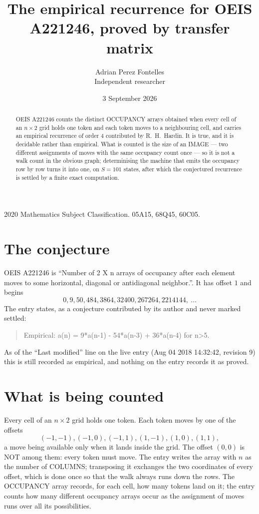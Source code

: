 \documentclass[11pt,a4paper]{article}
\title{The empirical recurrence for OEIS A221246, proved by transfer matrix}
\author{Adrian Perez Fontelles\\ \small Independent researcher}
\date{3 September 2026}
\theoremstyle{plain}
\theoremstyle{definition}
\begin{document}
\maketitle

\begin{abstract}
OEIS A221246 counts the distinct OCCUPANCY arrays obtained when every cell of an $n\times2$ grid
holds one token and each token moves to a neighbouring cell, and carries an empirical
recurrence of order $4$ contributed by R.~H.~Hardin. It is true, and it is decidable
rather than empirical. What is counted is the size of an IMAGE --- two different assignments of
moves with the same occupancy count once --- so it is not a walk count in the obvious graph;
determinising the machine that emits the occupancy row by row turns it into one, on $S=101$
states, after which the conjectured recurrence is settled by a finite exact computation.
\end{abstract}

\noindent\small 2020 Mathematics Subject Classification. 05A15, 68Q45, 60C05.\normalsize

\section{The conjecture}

OEIS A221246 is ``Number of 2 X n arrays of occupancy after each element moves to some horizontal, diagonal or antidiagonal neighbor.''. It has offset $1$ and begins
\[
0, 9, 50, 484, 3864, 32400, 267264, 2214144,\ \dots
\]
The entry states, as a conjecture contributed by its author and never marked settled:
\begin{quote}
Empirical: a(n) = 9*a(n-1) - 54*a(n-3) + 36*a(n-4) for n>5.
\end{quote}
As of the ``Last modified'' line on the live entry (Aug 04 2018 14:32:42, revision 9) this is still
recorded as empirical, and nothing on the entry records it as proved.

\section{What is being counted}

Every cell of an $n\times2$ grid holds one token. Each token moves by one of the offsets
\[
(-1,-1), (-1,0), (-1,1), (1,-1), (1,0), (1,1),
\]
a move being available only when it lands inside the grid. The offset $(0,0)$ is NOT among them: every token must move. The entry writes the array with $n$ as the number of COLUMNS; transposing it exchanges the two coordinates of every offset, which is done once so that the walk always runs down the rows. The OCCUPANCY array
records, for each cell, how many tokens land on it; the entry counts how many different
occupancy arrays occur as the assignment of moves runs over all its possibilities.
\end{document}
